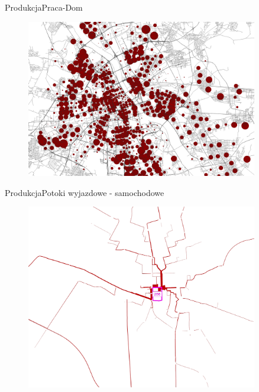 \documentclass[8pt]{beamer}
\begin{document}
\begin{frame}{Produkcja}{Praca-Dom}
\begin{figure}\begin{center}
\includegraphics[width=0.9\textwidth]{prod_WH2}
 \end{center}  \end{figure} 
\end{frame}

\begin{frame}{Produkcja}{Potoki wyjazdowe - samochodowe}
\begin{figure}\begin{center}
\includegraphics[width=0.9\textwidth]{zone_bundle}
 \end{center}  \end{figure} 
\end{frame}
\end{document}
